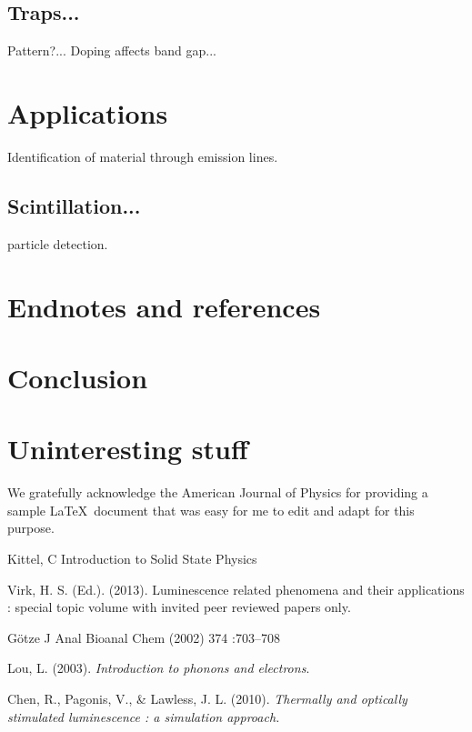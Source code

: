 \documentclass[prl,onecolumn]{revtex4-1}  %
\begin{document}
\subsection*{Traps...}
Pattern?...
Doping affects band gap...

\section{Applications}
Identification of material through emission lines.
\subsection*{Scintillation...}
particle detection.




\section{Endnotes and references}


\section{Conclusion}



\appendix*   %

\section{Uninteresting stuff}



\begin{acknowledgments}

We gratefully acknowledge the American Journal of Physics for providing a sample
\LaTeX\ document that was easy for me to edit and adapt for this purpose. 

\end{acknowledgments}


\begin{thebibliography}{99}



 Kittel, C Introduction to Solid State Physics

 Virk, H. S. (Ed.). (2013). Luminescence related phenomena and their applications : special topic volume with invited peer reviewed papers only. 

 G\"otze J  Anal Bioanal Chem (2002) 374 :703–708

Lou, L. (2003). \textit{Introduction to phonons and electrons}.

 Chen, R., Pagonis, V., \& Lawless, J. L. (2010). \textit{Thermally and optically stimulated luminescence : a simulation approach. }

\end{thebibliography}
\end{document}
